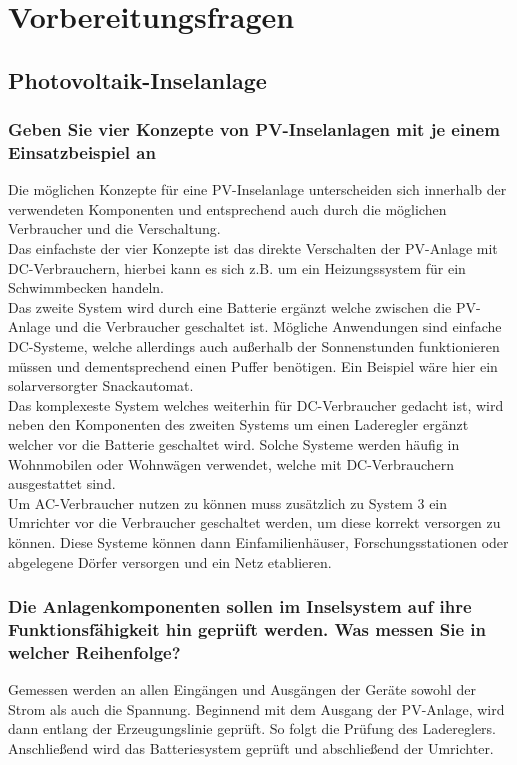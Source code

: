 \section{Vorbereitungsfragen}
\subsection{Photovoltaik-Inselanlage}
\subsubsection{Geben Sie vier Konzepte von PV-Inselanlagen mit je einem Einsatzbeispiel an}
Die möglichen Konzepte für eine PV-Inselanlage unterscheiden sich innerhalb der verwendeten
Komponenten und entsprechend auch durch die möglichen Verbraucher und die Verschaltung.\\
Das einfachste der vier Konzepte ist das direkte Verschalten der PV-Anlage mit
DC-Verbrauchern, hierbei kann es sich z.B. um ein Heizungssystem für ein Schwimmbecken handeln.\\
Das zweite System wird durch eine Batterie ergänzt welche zwischen die PV-Anlage und die Verbraucher geschaltet ist.
Mögliche Anwendungen sind einfache DC-Systeme, welche allerdings auch außerhalb der Sonnenstunden
funktionieren müssen und dementsprechend einen Puffer benötigen. Ein Beispiel wäre hier ein solarversorgter Snackautomat.\\
Das komplexeste System welches weiterhin für DC-Verbraucher gedacht ist, wird neben den Komponenten des zweiten Systems
um einen Laderegler ergänzt welcher vor die Batterie geschaltet wird. Solche Systeme werden häufig in
Wohnmobilen oder Wohnwägen verwendet, welche mit DC-Verbrauchern ausgestattet sind.\\
Um AC-Verbraucher nutzen zu können muss zusätzlich zu System 3 ein Umrichter vor die Verbraucher geschaltet werden, um diese
korrekt versorgen zu können. Diese Systeme können dann Einfamilienhäuser, Forschungsstationen oder abgelegene Dörfer versorgen und ein Netz etablieren.\\ 
\subsubsection{Die Anlagenkomponenten sollen im Inselsystem auf ihre Funktionsfähigkeit hin geprüft werden. Was messen Sie in welcher Reihenfolge?}
Gemessen werden an allen Eingängen und Ausgängen der Geräte sowohl der Strom als auch die Spannung.
Beginnend mit dem Ausgang der PV-Anlage, wird dann entlang der Erzeugungslinie geprüft.
So folgt die Prüfung des Ladereglers. Anschließend wird das Batteriesystem geprüft und abschließend der 
Umrichter.\\



